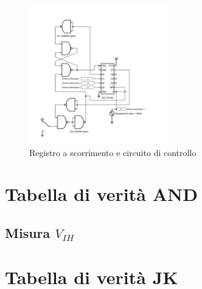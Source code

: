\documentclass[journal]{IEEEtran}
\begin{document}

\begin{figure}[H]%
\begin{center}
\includegraphics[width=0.54\textwidth]{sch-simulations/digital/output/shift-register.pdf}
\caption{Registro a scorrimento e circuito di controllo}
\label{fig:circuit_shift_register}
\end{center}
\end{figure}



\section{Tabella di verità AND}

\subsection{Misura $V_{IH}$ }


\section{Tabella di verità JK}

\end{document}
